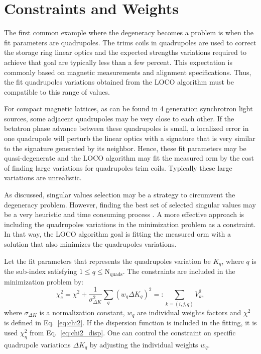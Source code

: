 \section{Constraints and Weights}\label{sec:constraint}
The first common example where the degeneracy becomes a problem is when the fit parameters are quadrupoles. The trims coils in quadrupoles are used to correct the storage ring linear optics and the expected strengths variations required to achieve that goal are typically less than a few percent. This expectation is commonly based on magnetic measurements and alignment specifications. Thus, the fit quadrupoles variations obtained from the LOCO algorithm must be compatible to this range of values. 

For compact magnetic lattices, as can be found in 4 generation synchrotron light sources, some adjacent quadrupoles may be very close to each other. If the betatron phase advance between these quadrupoles is small, a localized error in one quadrupole will perturb the linear optics with a signature that is very similar to the signature generated by its neighbor. Hence, these fit parameters may be quasi-degenerate and the LOCO algorithm may fit the measured \gls{orm} by the cost of finding large variations for quadrupoles trim coils. Typically these large variations are unrealistic.

As discussed, singular values selection may be a strategy to circumvent the degeneracy problem. However, finding the best set of selected singular values may be a very heuristic and time consuming process \cite{icfa_laurent}. A more effective approach is including the quadrupoles variations in the minimization problem as a constraint. In that way, the LOCO algorithm goal is fitting the measured \gls{orm} with a solution that also minimizes the quadrupoles variations. 

Let the fit parameters that represents the quadrupoles variation be $K_{q}$, where $q$ is the sub-index satisfying $1 \leq q \leq \mathrm{N}_{\mathrm{quads}}$. The constraints are included in the minimization problem by:
\begin{equation}
    \chi^2_{c} = \chi^2 + \dfrac{1}{\sigma_{\Delta K}^2}\sum_q \left(w_q \Delta K_q\right)^2 =: \sum_{{k = (i,j, q)}} V_{k}^2,
    \label{eq:chi2_constraint}
\end{equation}
where $\sigma_{\Delta K}$ is a normalization constant, $w_q$ are individual weights factors and $\chi^2$ is defined in Eq.~\eqref{eq:chi2}. If the dispersion function is included in the fitting, it is used $\chi^2_{\eta}$ from Eq.~\eqref{eq:chi2_disp}. One can control the constraint on specific quadrupole variations $\Delta K_q$ by adjusting the individual weights $w_q$.

